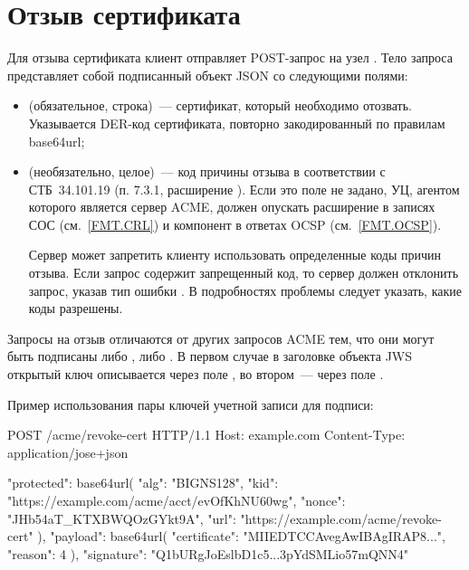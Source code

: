 \section{Отзыв сертификата}\label{ACME.Revoke}

Для отзыва сертификата клиент отправляет POST-запрос на узел . 
Тело запроса представляет собой подписанный объект JSON со следующими полями:

\begin{itemize}
\item
{} (обязательное, строка)~--- 
сертификат, который необходимо отозвать. Указывается DER-код сертификата,
повторно закодированный по правилам base64url;

\item
{} (необязательно, целое)~--- код причины отзыва в соответствии 
с СТБ~34.101.19 (п. 7.3.1, расширение ).
%
Если это поле не задано, УЦ, агентом которого является сервер ACME, должен 
опускать расширение  в записях СОС (см.~\ref{FMT.CRL}) и 
компонент  в ответах OCSP (см.~\ref{FMT.OCSP}).

Сервер может запретить клиенту использовать определенные коды причин отзыва.
Если запрос содержит запрещенный код, то сервер должен отклонить запрос, указав 
тип ошибки . В подробностях проблемы следует
указать, какие коды разрешены. 
\end{itemize}

Запросы на отзыв отличаются от других запросов ACME тем, что они могут быть 
подписаны либо , либо 
.  
%
В первом случае в заголовке объекта JWS открытый ключ описывается через 
поле , во втором~--- через поле .

Пример использования пары ключей учетной записи для подписи: 

\begin{codeblock}
POST /acme/revoke-cert HTTP/1.1
Host: example.com
Content-Type: application/jose+json

{
  "protected": base64url({
    "alg": "BIGNS128",
    "kid": "https://example.com/acme/acct/evOfKhNU60wg",
    "nonce": "JHb54aT_KTXBWQOzGYkt9A",
    "url": "https://example.com/acme/revoke-cert"
  }),
  "payload": base64url({
    "certificate": "MIIEDTCCAvegAwIBAgIRAP8...",
    "reason": 4
  }),
  "signature": "Q1bURgJoEslbD1c5...3pYdSMLio57mQNN4"
}
\end{codeblock}

